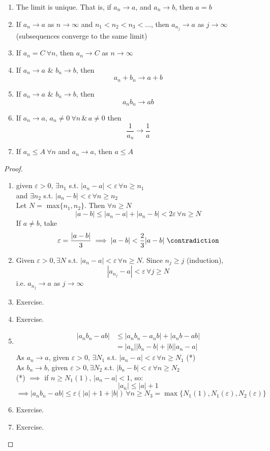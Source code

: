 \begin{lemma}
\hfill{ }
\begin{enumerate}
    \item The limit is unique. That is, if $a_n \to a$, and $a_n \to b$, then $a = b$
    \item If $a_n \to a$ as $n \to \infty$ and $n_1 < n_2 < n_3<  \dots$, then $a_{n_j} \to a$ as $j \to \infty$ (subsequences converge to the same limit)
    \item If $a_n = C \ \forall n$, then $a_n \to C$ as $n \to \infty$
    \item If $a_n \to a$ \& $b_n \to b$, then \[a_n + b_n \to a + b\]
    \item If $a_n \to a$ \& $b_n \to b$, then \[a_nb_n \to ab\]
    \item If $a_n \to a,\, a_n \neq 0 \ \forall n \,\& \,a \neq 0$ then \[\frac{1}{a_n} \to \frac{1}{a}\]
    \item If $a_n \leq A \  \forall n$ and $a_n \to a$, then $a \leq A$
\end{enumerate}
\begin{proof}
\hfill{ }
\begin{enumerate}
    \item given $\varepsilon > 0$, $\exists n_1$ s.t. $|a_n - a| < \varepsilon\, \forall n \geq n_1$\\
    and $\exists n_2$ s.t. $|a_n - b| < \varepsilon\, \forall n \geq n_2$\\
    Let $N =$ max$\{n_1,n_2\}$. Then $\forall n \geq N$\\
    \[|a-b| \leq |a_n - a| + |a_n - b| < 2\varepsilon \, \forall n \geq N\]
    If $a \neq b$, take
    \[\varepsilon = \frac{|a-b|}{3} \implies |a-b| < \frac{2}{3}|a-b|  \ \contradiction\]
    \item Given $\varepsilon > 0, \exists N$ s.t. $|a_n - a| < \varepsilon \, \forall n \geq N$. Since $n_j \geq j$ (induction),\\
    \[|a_{n_j} - a| < \varepsilon \, \forall j \geq N\]
    i.e. $a_{n_j} \to a$ as $j \to \infty$
    \item Exercise.
    \item Exercise.
    \item \begin{align*}
        |a_nb_n - ab| &\leq |a_nb_n - a_n b| + |a_nb - ab|\\
        &= |a_n||b_n - b| + |b||a_n - a|
    \end{align*}
    As $a_n \to a$, given $\varepsilon > 0,\, \exists N_1$ s.t. $|a_n - a| < \varepsilon \, \forall n \geq N_1$ (*)\\
    As $b_n \to b$, given $\varepsilon > 0, \exists N_2$ s.t. $|b_n - b| < \varepsilon \, \forall n \geq N_2$\\
    (*) $\implies$ if $n \geq N_1(1),\, |a_n - a| < 1$, so:
    \[|a_n| \leq |a| + 1\]
    \[\implies |a_nb_n - ab| \leq \varepsilon(|a| + 1 + |b|) \, \forall n \geq N_3 = \max\{N_1(1),N_1(\varepsilon),N_2(\varepsilon)\}\]
    
    \item Exercise.
    \item Exercise.
\end{enumerate}
\end{proof}
\end{lemma}

